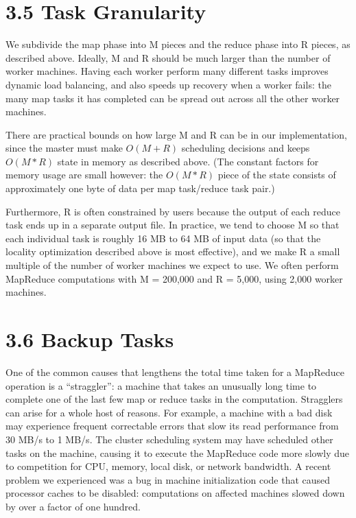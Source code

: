 \documentclass[
]{article}
\begin{document}
\section{3.5 Task Granularity}\label{task-granularity}

We subdivide the map phase into M pieces and the reduce phase into R
pieces, as described above. Ideally, M and R should be much larger than
the number of worker machines. Having each worker perform many different
tasks improves dynamic load balancing, and also speeds up recovery when
a worker fails: the many map tasks it has completed can be spread out
across all the other worker machines.

There are practical bounds on how large M and R can be in our
implementation, since the master must make \(O(M + R)\) scheduling
decisions and keeps \(O(M * R)\) state in memory as described above.
(The constant factors for memory usage are small however: the
\(O(M * R)\) piece of the state consists of approximately one byte of
data per map task/reduce task pair.)

Furthermore, R is often constrained by users because the output of each
reduce task ends up in a separate output file. In practice, we tend to
choose M so that each individual task is roughly 16 MB to 64 MB of input
data (so that the locality optimization described above is most
effective), and we make R a small multiple of the number of worker
machines we expect to use. We often perform MapReduce computations with
M = 200,000 and R = 5,000, using 2,000 worker machines.

\section{3.6 Backup Tasks}\label{backup-tasks}

One of the common causes that lengthens the total time taken for a
MapReduce operation is a ``straggler'': a machine that takes an
unusually long time to complete one of the last few map or reduce tasks
in the computation. Stragglers can arise for a whole host of reasons.
For example, a machine with a bad disk may experience frequent
correctable errors that slow its read performance from 30 MB/s to 1
MB/s. The cluster scheduling system may have scheduled other tasks on
the machine, causing it to execute the MapReduce code more slowly due to
competition for CPU, memory, local disk, or network bandwidth. A recent
problem we experienced was a bug in machine initialization code that
caused processor caches to be disabled: computations on affected
machines slowed down by over a factor of one hundred.
\end{document}
